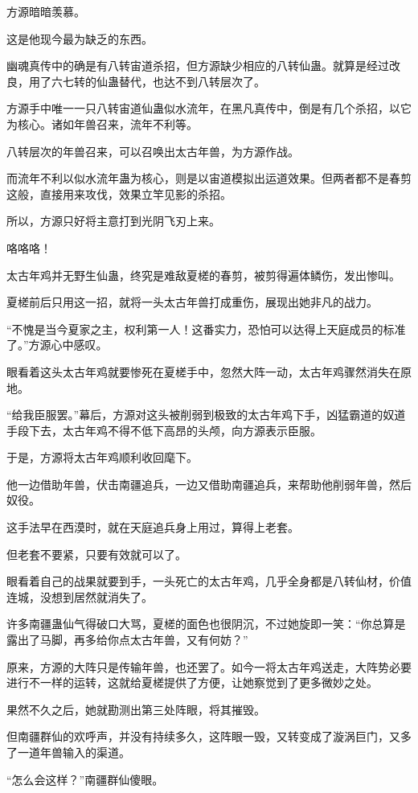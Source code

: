 \begin{this_body}
方源暗暗羡慕。

这是他现今最为缺乏的东西。

幽魂真传中的确是有八转宙道杀招，但方源缺少相应的八转仙蛊。就算是经过改良，用了六七转的仙蛊替代，也达不到八转层次了。

方源手中唯一一只八转宙道仙蛊似水流年，在黑凡真传中，倒是有几个杀招，以它为核心。诸如年兽召来，流年不利等。

八转层次的年兽召来，可以召唤出太古年兽，为方源作战。

而流年不利以似水流年蛊为核心，则是以宙道模拟出运道效果。但两者都不是春剪这般，直接用来攻伐，效果立竿见影的杀招。

所以，方源只好将主意打到光阴飞刃上来。

咯咯咯！

太古年鸡并无野生仙蛊，终究是难敌夏槎的春剪，被剪得遍体鳞伤，发出惨叫。

夏槎前后只用这一招，就将一头太古年兽打成重伤，展现出她非凡的战力。

“不愧是当今夏家之主，权利第一人！这番实力，恐怕可以达得上天庭成员的标准了。”方源心中感叹。

眼看着这头太古年鸡就要惨死在夏槎手中，忽然大阵一动，太古年鸡骤然消失在原地。

“给我臣服罢。”幕后，方源对这头被削弱到极致的太古年鸡下手，凶猛霸道的奴道手段下去，太古年鸡不得不低下高昂的头颅，向方源表示臣服。

于是，方源将太古年鸡顺利收回麾下。

他一边借助年兽，伏击南疆追兵，一边又借助南疆追兵，来帮助他削弱年兽，然后奴役。

这手法早在西漠时，就在天庭追兵身上用过，算得上老套。

但老套不要紧，只要有效就可以了。

眼看着自己的战果就要到手，一头死亡的太古年鸡，几乎全身都是八转仙材，价值连城，没想到居然就消失了。

许多南疆蛊仙气得破口大骂，夏槎的面色也很阴沉，不过她旋即一笑：“你总算是露出了马脚，再多给你点太古年兽，又有何妨？”

原来，方源的大阵只是传输年兽，也还罢了。如今一将太古年鸡送走，大阵势必要进行不一样的运转，这就给夏槎提供了方便，让她察觉到了更多微妙之处。

果然不久之后，她就勘测出第三处阵眼，将其摧毁。

但南疆群仙的欢呼声，并没有持续多久，这阵眼一毁，又转变成了漩涡巨门，又多了一道年兽输入的渠道。

“怎么会这样？”南疆群仙傻眼。

\end{this_body}

